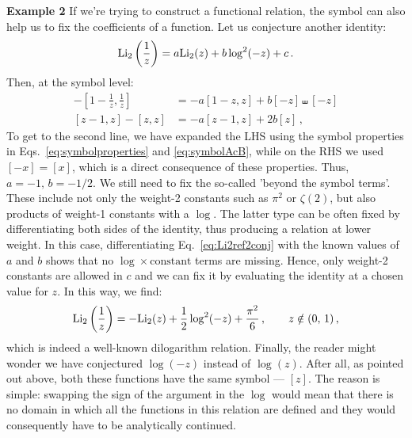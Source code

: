 \documentclass[main.tex]{subfiles}
\begin{document}
\textbf{Example 2} \newline
If we're trying to construct a functional relation, the symbol can also help us to fix the coefficients of a function. Let us conjecture another identity:
\begin{equation} \label{eq:Li2ref2conj}
    \text{Li}_2\left( \frac{1}{z} \right) = a\text{Li}_2(z) + b \log^2(-z) + c\,.
\end{equation}
Then, at the symbol level:
\begin{align}
    -\left[1-\frac{1}{z}, \frac{1}{z}\right] &= -a[1-z, z] + b[-z] \shuffle [-z] \nonumber \\
    [z-1,z] - [z,z] &= -a[z-1, z] + 2 b[z]\,,
\end{align}
To get to the second line, we have expanded the LHS using the symbol properties in Eqs.~\ref{eq:symbolproperties} and \ref{eq:symbolAcB}, while on the RHS we used $[-x]=[x]$, which is a direct consequence of these properties. Thus, $a=-1, \, b=-1/2$. We still need to fix the so-called 'beyond the symbol terms'. These include not only the weight-2 constants such as $\pi^2$ or $\zeta(2)$, but also products of weight-1 constants with a $\log$. The latter type can be often fixed by differentiating both sides of the identity, thus producing a relation at lower weight. In this case, differentiating Eq.~\ref{eq:Li2ref2conj} with the known values of $a$ and $b$ shows that no $\log \times \text{constant}$ terms are missing. Hence, only weight-2 constants are allowed in $c$ and we can fix it by evaluating the identity at a chosen value for $z$. In this way, we find:
\begin{equation} \label{eq:Li2ref2}
    \text{Li}_2\left( \frac{1}{z} \right) = -\text{Li}_2(z) + \frac{1}{2} \log^2(-z) + \frac{\pi^2}{6}\,, \qquad z \notin (0,\, 1)\,,
\end{equation}
which is indeed a well-known dilogarithm relation. Finally, the reader might wonder we have conjectured $\log(-z)$ instead of $\log(z)$. After all, as pointed out above, both these functions have the same symbol --- $[z]$. The reason is simple: swapping the sign of the argument in the $\log$ would mean that there is no domain in which all the functions in this relation are defined and they would consequently have to be analytically continued.
\end{document}
